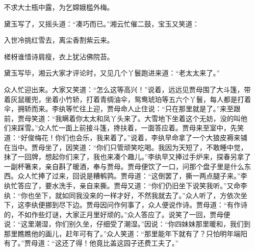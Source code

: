 不求大士瓶中露，为乞嫦娥槛外梅。

黛玉写了，又摇头道：``凑巧而已。''湘云忙催二鼓，宝玉又笑道：

入世冷挑红雪去，离尘香割紫云来。

槎枒谁惜诗肩瘦，衣上犹沾佛院苔。

黛玉写毕，湘云大家才评论时，又见几个丫鬟跑进来道：``老太太来了。''

众人忙迎出来。大家又笑道：``怎么这等高兴！''说着，远远见贾母围了大斗篷，带着灰鼠暖兜，坐着小竹轿，打着青绸油伞，鸳鸯琥珀等五六个丫鬟，每人都是打着伞，拥轿而来。李纨等忙往上迎，贾母命人止住说：``只在那里就是了。''来至跟前，贾母笑道：``我瞒着你太太和凤丫头来了。大雪地下坐着这个无妨，没的叫他们来踩雪。''众人忙一面上前接斗篷，搀扶着，一面答应着。贾母来至室中，先笑道：``好俊梅花！你们也会乐，我来着了。''说着，李纨早命拿了一个大狼皮褥来铺在当中。贾母坐了，因笑道：``你们只管顽笑吃喝。我因为天短了，不敢睡中觉，抹了一回牌，想起你们来了，我也来凑个趣儿。''李纨早又捧过手炉来，探春另拿了一副杯箸来，亲自斟了暖酒，奉与贾母。贾母便饮了一口，问那个盘子里是什么东西。众人忙捧了过来，回说是糟鹌鹑。贾母道：``这倒罢了，撕一两点腿子来。''李纨忙答应了，要水洗手，亲自来撕。贾母又道：``你们仍旧坐下说笑我听。''又命李纨：``你也坐下，就如同我没来的一样才好，不然我就去了。''众人听了，方依次坐下，这李纨便挪到尽下边。贾母因问作何事了，众人便说作诗。贾母道：``有作诗的，不如作些灯谜，大家正月里好顽的。''众人答应了。说笑了一回，贾母便说：``这里潮湿，你们别久坐，仔细受了潮湿。''因说：``你四妹妹那里暖和，我们到那里瞧瞧他的画儿，赶年可有了。''众人笑道：``那里能年下就有了？只怕明年端阳有了。''贾母道：``这还了得！他竟比盖这园子还费工夫了。''

